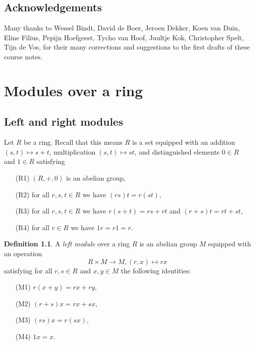 \documentclass[11pt]{amsbook}
\theoremstyle{plain}
\theoremstyle{definition}
\newtheorem{definition}[theorem]{Definition}
\begin{document}
\section*{Acknowledgements}

Many thanks to  Wessel Bindt, David de Boer, Jeroen Dekker, Koen van Duin, Eline Filius, Pepijn Hoefgeest, Tycho van Hoof, Juultje Kok, Christopher Spelt, Tijn de Vos, for their many corrections and suggestions to the first drafts of these course notes. 




\chapter{Modules over a ring}
\label{chapter:modules}


\section{Left and right modules}

Let $R$ be a ring. Recall that this means $R$ is a set equipped with an addition $(s,t)\mapsto s+t$, multiplication $(s,t)\mapsto st$, and distinguished elements $0\in R$ and $1\in R$ satisfying 
\begin{enumerate}
\item[(R1)] $(R,+,0)$ is an abelian group,
\item[(R2)] for all $r,s,t \in R$ we have $(rs)t = r(st)$,
\item[(R3)] for all $r,s,t \in R$ we have $r(s+t) = rs+rt$ and $(r+s)t=rt+st$,
\item[(R4)] for all $r\in R$ we have $1r = r1=r$.
\end{enumerate}


\begin{definition}A \emph{left module} over a ring $R$ is an abelian group $M$ equipped with an operation
\[
	R\times M \to M, (r,x) \mapsto rx
\]
satisfying for all $r,s\in R$ and $x,y \in M$ the following identities:
\begin{enumerate}
\item[(M1)] $r(x+y)=rx+ry$,
\item[(M2)] $(r+s)x=rx+sx$,
\item[(M3)] $(rs)x=r(sx)$,
\item[(M4)] $1x=x$.
\end{enumerate}
\end{definition}
\end{document}
